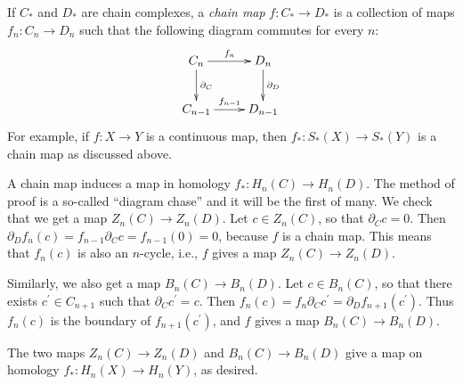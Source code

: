 If $C_\ast$ and $D_\ast$ are chain complexes, a \emph{chain map} $f\colon C_\ast\to D_\ast$ is a collection of maps $f_n\colon C_n\to D_n$ such that the following diagram commutes for every $n$:
\begin{equation*}
    \xymatrix{
	C_n\ar[r]^{f_n}\ar[d]^{\partial_C} & D_n\ar[d]^{\partial_D}\\
	C_{n-1}\ar[r]^{f_{n-1}} & D_{n-1}
    }
\end{equation*}
For example, if $f\colon X\to Y$ is a continuous map, then $f_\ast \colon S_\ast(X)\to S_\ast(Y)$ is a chain map as discussed above.

A chain map induces a map in homology $f_\ast: H_n(C)\to H_n(D)$. The method of proof is a so-called ``diagram chase'' and it will be the first of many. We check that we get a map $Z_n(C)\to Z_n(D)$. Let $c\in Z_n(C)$, so that $\partial_C c = 0$. Then $\partial_D f_n(c) = f_{n-1}\partial_C c = f_{n-1}(0) = 0$, because $f$ is a chain map. This means that $f_n(c)$ is also an $n$-cycle, i.e., $f$ gives a map $Z_n(C)\to Z_n(D)$.

Similarly, we also get a map $B_n(C)\to B_n(D)$. Let $c\in B_n(C)$, so that there exists $c^\prime \in C_{n+1}$ such that $\partial_C c^\prime = c$. Then $f_n(c) = f_n\partial_C c^\prime = \partial_D f_{n+1}(c^\prime)$. Thus $f_n(c)$ is the boundary of $f_{n+1}(c^\prime)$, and $f$ gives a map $B_n(C)\to B_n(D)$.

The two maps $Z_n(C)\to Z_n(D)$ and $B_n(C)\to B_n(D)$ give a map on homology $f_\ast: H_n(X)\to H_n(Y)$, as desired.